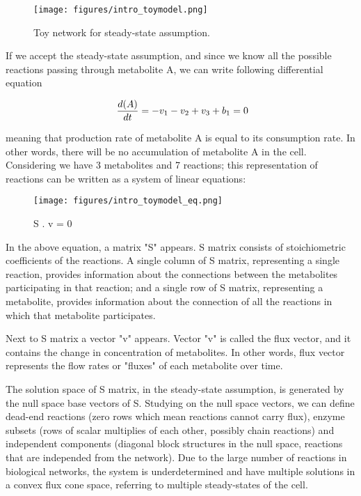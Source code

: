 \begin{figure}[h]
\begin{center}
\texttt{[image: figures/intro\_toymodel.png]}
\end{center}
\caption[Toy network for steady-state assumption]{Toy network for steady-state assumption.}
\label{fig:ToyNetwork}
\end{figure}

If we accept the steady-state assumption, and since we know all the possible reactions passing through metabolite A, we can write following differential equation

\begin{equation}
 \ \frac{d(A)}{dt} = - v_1 - v_2 + v_3 + b_1 = 0 \\
\end{equation}


meaning that production rate of metabolite A is equal to its consumption rate. In other words, there will be no accumulation of metabolite A in the cell. Considering we have 3 metabolites and 7 reactions; this representation of reactions can be written as a system of linear equations:
\begin{figure}[h]
\texttt{[image: figures/intro\_toymodel\_eq.png]}
\begin{center}S . v = 0 \end{center}
\end{figure}

In the above equation, a matrix "S" appears. S matrix consists of stoichiometric coefficients of the reactions. A single column of S matrix, representing a single reaction, provides information about the connections between the metabolites participating in that reaction; and a single row of S matrix, representing a metabolite, provides information about the connection of all the reactions in which that metabolite participates.

Next to S matrix a vector "v" appears. Vector "v" is called the flux vector, and it contains the change in concentration of metabolites. In other words, flux vector represents the flow rates or "fluxes" of each metabolite over time.

The solution space of S matrix, in the steady-state assumption, is generated by the null space base vectors of S. Studying on the null space vectors, we can define dead-end reactions (zero rows which mean reactions cannot carry flux), enzyme subsets (rows of scalar multiplies of each other, possibly chain reactions) and independent components (diagonal block structures in the null space, reactions that are independed from the network). Due to the large number of reactions in biological networks, the system is underdetermined and have multiple solutions in a convex flux cone space, referring to multiple steady-states of the cell.

